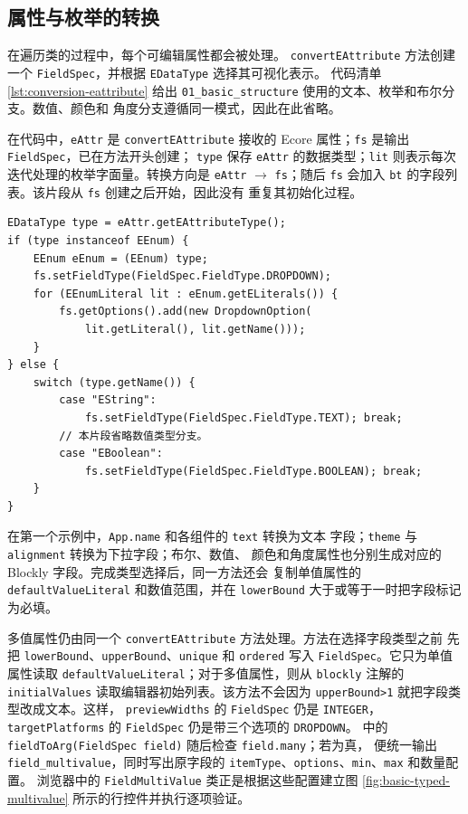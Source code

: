 \subsection{属性与枚举的转换}

在遍历类的过程中，每个可编辑属性都会被处理。
\texttt{convert}\allowbreak\texttt{EAttribute} 方法创建一个
\texttt{FieldSpec}，并根据 \texttt{EDataType} 选择其可视化表示。
代码清单 \ref{lst:conversion-eattribute} 给出
\texttt{01\_basic\_structure} 使用的文本、枚举和布尔分支。数值、颜色和
角度分支遵循同一模式，因此在此省略。

在代码中，\texttt{eAttr} 是 \texttt{convertEAttribute} 接收的 Ecore
属性；\texttt{fs} 是输出 \texttt{FieldSpec}，已在方法开头创建；
\texttt{type} 保存 \texttt{eAttr} 的数据类型；\texttt{lit} 则表示每次
迭代处理的枚举字面量。转换方向是
\texttt{eAttr} $\rightarrow$ \texttt{fs}；随后 \texttt{fs} 会加入
\texttt{bt} 的字段列表。该片段从 \texttt{fs} 创建之后开始，因此没有
重复其初始化过程。

\newpage
\begin{lstlisting}[style=tfmjavaecore, captionpos=t, caption={Ecore 属性类型到字段类型的转换}, label={lst:conversion-eattribute}]
EDataType type = eAttr.getEAttributeType();
if (type instanceof EEnum) {
    EEnum eEnum = (EEnum) type;
    fs.setFieldType(FieldSpec.FieldType.DROPDOWN);
    for (EEnumLiteral lit : eEnum.getELiterals()) {
        fs.getOptions().add(new DropdownOption(
            lit.getLiteral(), lit.getName()));
    }
} else {
    switch (type.getName()) {
        case "EString":
            fs.setFieldType(FieldSpec.FieldType.TEXT); break;
        // 本片段省略数值类型分支。
        case "EBoolean":
            fs.setFieldType(FieldSpec.FieldType.BOOLEAN); break;
    }
}
\end{lstlisting}

在第一个示例中，\texttt{App.name} 和各组件的 \texttt{text} 转换为文本
字段；\texttt{theme} 与 \texttt{alignment} 转换为下拉字段；布尔、数值、
颜色和角度属性也分别生成对应的 Blockly 字段。完成类型选择后，同一方法还会
复制单值属性的 \texttt{defaultValueLiteral} 和数值范围，并在
\texttt{lowerBound} 大于或等于一时把字段标记为必填。

多值属性仍由同一个 \texttt{convertEAttribute} 方法处理。方法在选择字段类型之前
先把 \texttt{lowerBound}、\texttt{upperBound}、\texttt{unique} 和
\texttt{ordered} 写入 \texttt{FieldSpec}。它只为单值属性读取
\texttt{defaultValueLiteral}；对于多值属性，则从 \texttt{blockly} 注解的
\texttt{initialValues} 读取编辑器初始列表。该方法不会因为
\texttt{upperBound>1} 就把字段类型改成文本。这样，
\texttt{previewWidths} 的 \texttt{FieldSpec} 仍是 \texttt{INTEGER}，
\texttt{targetPlatforms} 的 \texttt{FieldSpec} 仍是带三个选项的
\texttt{DROPDOWN}。 中的
\texttt{fieldToArg(FieldSpec field)} 随后检查 \texttt{field.many}；若为真，
便统一输出 \texttt{field\_multivalue}，同时写出原字段的
\texttt{itemType}、\texttt{options}、\texttt{min}、\texttt{max} 和数量配置。
浏览器中的 \texttt{FieldMultiValue} 类正是根据这些配置建立图
\ref{fig:basic-typed-multivalue} 所示的行控件并执行逐项验证。

